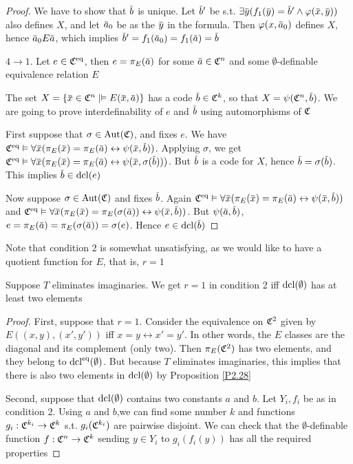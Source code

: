 \documentclass[11pt]{article}
\begin{document}
\begin{proof}
We have to show that \(\barb\) is unique. Let \(\barb'\) be
s.t. \(\exists\bary(f_1(\bary)=\barb'\wedge\varphi(\barx,\bary))\) also defines \(X\), and let \(\bara_0\) be as
the \(\bary\) in the formula. Then \(\varphi(x,\bara_0)\) defines \(X\), hence \(\bara_0E\bara\),
which implies \(\barb'=f_1(\bara_0)=f_1(\bara)=\barb\)

\(4\to 1\). Let \(e\in \mathfrak{C}^{\operatorname{eq}}\), then \(e=\pi_E(\bara)\) for some \(\bara\in \fC^n\) and
some \(\emptyset\)-definable equivalence relation \(E\)

The set \(X=\{\barx\in\fC^n\mid\vDash E(\barx,\bara)\}\) has a code \(\barb\in\fC^k\), so
that \(X=\psi(\fC^n,\barb)\). We are going to prove interdefinability of \(e\) and \(\barb\) using
automorphisms of \(\mathfrak{C}\)

First suppose that \(\sigma\in\operatorname{\text{Aut}}(\mathfrak{C})\), and fixes \(e\). We
have \(\fC^{\eq}\vDash\forall\barx(\pi_E(\barx)=\pi_E(\bara)\leftrightarrow\psi(\barx,\barb))\). Applying \(\sigma\), we
get \(\fC^{\eq}\vDash\forall\barx(\pi_E(\barx)=\pi_E(\bara)\leftrightarrow\psi(\barx,\sigma(\barb)))\). But \(\barb\) is a code
for \(X\), hence \(\barb=\sigma(\barb)\). This implies \(\barb\in\dcl(e)\)

Now suppose \(\sigma\in\operatorname{\text{Aut}}(\mathfrak{C})\) and fixes \(\barb\).
Again \(\fC^{\eq}\vDash\forall\barx(\pi_E(\barx)=\pi_E(\bara)\leftrightarrow\psi(\barx,\barb))\)
and \(\fC^{\eq}\vDash\forall\barx(\pi_E(\barx)=\pi_E(\sigma(\bara))\leftrightarrow\psi(\barx,\barb))\).
But \(\psi(\bara,\barb)\), \(e=\pi_E(\bara)=\pi_E(\sigma(\bara))=\sigma(e)\). Hence \(e\in\dcl(\barb)\)
\end{proof}

Note that condition 2 is somewhat unsatisfying, as we would like to have a quotient function
for \(E\), that is, \(r=1\)

\begin{proposition}[]
Suppose \(T\) eliminates imaginaries. We get \(r=1\) in condition 2 iff \(\operatorname{dcl}(\emptyset)\) has at least
two elements
\end{proposition}

\begin{proof}
First, suppose that \(r=1\). Consider the equivalence on \(\mathfrak{C}^2\) given by \(E((x,y),(x',y'))\)
iff \(x=y\leftrightarrow x'=y'\). In other words, the \(E\) classes are the diagonal and its complement (only
two). Then \(\pi_E(\mathfrak{C}^2)\) has two elements, and they belong to \(\operatorname{dcl}^{\operatorname{eq}}(\emptyset)\). But because \(T\)
eliminates imaginaries, this implies that there is also two elements in \(\operatorname{dcl}(\emptyset)\) by
Proposition \ref{P2.28}

Second, suppose that \(\operatorname{dcl}(\emptyset)\) contains two constants \(a\) and \(b\). Let \(Y_i,f_i\) be as in
condition 2. Using \(a\) and \(b\),we can find some number \(k\) and functions \(g_i:\mathfrak{C}^{k_i}\to\mathfrak{C}^k\)
s.t. \(g_i(\mathfrak{C}^{k_i})\) are pairwise disjoint. We can check that the \(\emptyset\)-definable
function \(f:\mathfrak{C}^n\to\mathfrak{C}^k\) sending \(y\in Y_i\) to \(g_i(f_i(y))\) has all the required properties
\end{proof}
\end{document}
